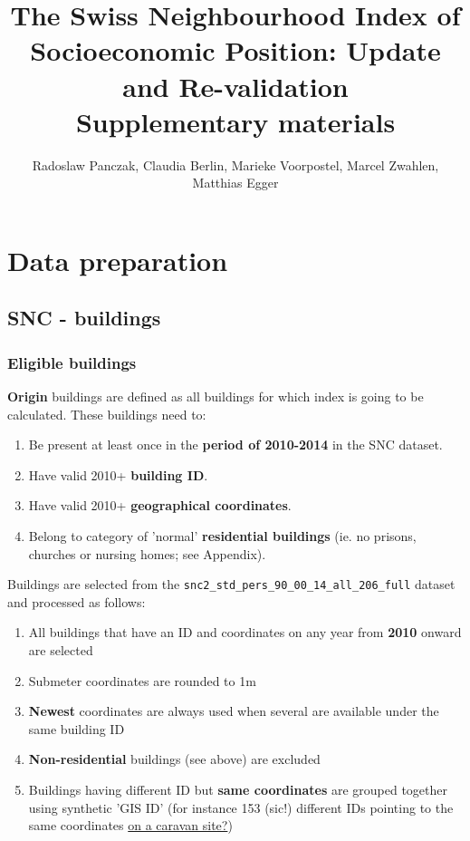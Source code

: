 \documentclass[a4paper, notitlepage, fleqn]{article} %
\title{The Swiss Neighbourhood Index of Socioeconomic Position: Update and Re-validation\\[0.2em]\smaller{}Supplementary materials}
\author{Radoslaw Panczak, Claudia Berlin, Marieke Voorpostel, Marcel Zwahlen, Matthias Egger}
\begin{document}
\maketitle
\tableofcontents
\newpage
\section{Data preparation}
\subsection{SNC - buildings}
\subsubsection{Eligible buildings}

\textbf{Origin} buildings are defined as all buildings for which index 
is going to be calculated. These buildings need to:

\begin{enumerate}

	\item Be present at least once in the \textbf{period of 2010-2014} in the SNC dataset.
	\item Have valid 2010+ \textbf{building ID}.
	\item Have valid 2010+ \textbf{geographical coordinates}.
	\item Belong to category of 'normal' \textbf{residential buildings} (ie. no prisons, churches or nursing homes; see Appendix).
	
\end{enumerate}
	
Buildings are selected from the \texttt{snc2\_std\_pers\_90\_00\_14\_all\_206\_full} dataset 
and processed as follows:
	
\begin{enumerate}

	\item All buildings that have an ID and coordinates on any year from \textbf{2010} onward are selected
		
	\item Submeter coordinates are rounded to 1m
		
	\item \textbf{Newest} coordinates are always used when several are available under the same building ID
	
	\item \textbf{Non-residential} buildings (see above) are excluded
	
	\item Buildings having different ID but \textbf{same coordinates} are grouped together using synthetic 'GIS ID'
		(for instance 153 (sic!) different IDs pointing to the same coordinates \href{https://goo.gl/maps/eC8fDZtEboP2}{on a caravan site?})
		
\end{enumerate}
\end{document}
